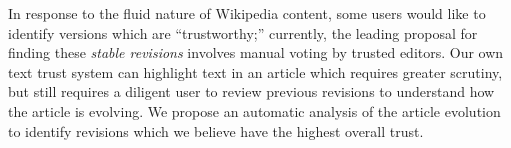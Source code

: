    In response to the fluid nature of Wikipedia content,
    some users would like to identify versions which
    are ``trustworthy;'' currently, the leading proposal
    for finding these \textit{stable revisions}
    involves manual voting by trusted editors.
    Our own text trust system can highlight text in
    an article which requires greater scrutiny, but
    still requires a diligent user to review previous
    revisions to understand how the article is evolving.
    We propose an automatic analysis of the article evolution
    to identify revisions which we believe
    have the highest overall trust.

